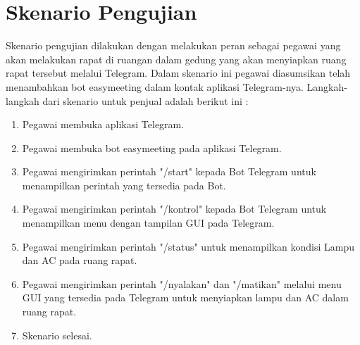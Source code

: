\section{Skenario Pengujian}
\tab Skenario pengujian dilakukan dengan melakukan peran sebagai pegawai yang akan melakukan rapat di ruangan dalam gedung yang akan menyiapkan ruang rapat tersebut melalui Telegram. Dalam skenario ini pegawai diasumsikan telah menambahkan bot easymeeting dalam kontak aplikasi Telegram-nya. Langkah-langkah dari skenario untuk penjual adalah berikut ini :
	\begin{enumerate}
		\item Pegawai membuka aplikasi Telegram.
		\item Pegawai membuka bot easymeeting pada aplikasi Telegram.
		\item Pegawai mengirimkan perintah "/start" kepada Bot Telegram untuk menampilkan perintah yang tersedia pada Bot.
		\item Pegawai mengirimkan perintah "/kontrol" kepada Bot Telegram untuk menampilkan menu dengan tampilan GUI pada Telegram.
		\item Pegawai mengirimkan perintah "/status" untuk menampilkan kondisi Lampu dan AC pada ruang rapat.
		\item Pegawai mengirimkan perintah "/nyalakan" dan "/matikan" melalui menu GUI yang tersedia pada Telegram untuk menyiapkan lampu dan AC dalam ruang rapat.
		\item Skenario selesai.
	\end{enumerate}
	
